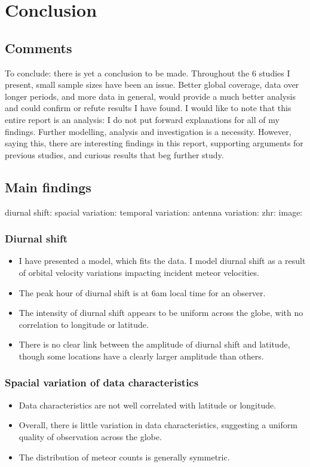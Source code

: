 \chapter{Conclusion}
\section{Comments}
To conclude: there is yet a conclusion to be made. Throughout the 6 studies I present, small sample sizes have been an issue. Better global coverage, data over longer periods, and more data in general, would provide a much better analysis and could confirm or refute results I have found. I would like to note that this entire report is an analysis: I do not put forward explanations for all of my findings. Further modelling, analysis and investigation is a necessity. However, saying this, there are interesting findings in this report, supporting arguments for previous studies, and curious results that beg further study.
\section{Main findings}
diurnal shift:
spacial variation:
temporal variation:
antenna variation:
zhr:
image:
\subsection{Diurnal shift}
\begin{itemize}
	\item I have presented a model, which fits the data. I model diurnal shift as a result of orbital velocity variations impacting incident meteor velocities.
	\item The peak hour of diurnal shift is at 6am local time for an observer.
	\item The intensity of diurnal shift appears to be uniform across the globe, with no correlation to longitude or latitude.
	\item There is no clear link between the amplitude of diurnal shift and latitude, though some locations have a clearly larger amplitude than others.
\end{itemize}
\subsection{Spacial variation of data characteristics}
\begin{itemize}
	\item Data characteristics are not well correlated with latitude or longitude.
	\item Overall, there is little variation in data characteristics, suggesting a uniform quality of observation across the globe.
	\item The distribution of meteor counts is generally symmetric.
\end{itemize}
